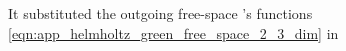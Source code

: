 It substituted
the outgoing free-space 's functions
\eqref{eqn:app_helmholtz_green_free_space_2_3_dim} in
